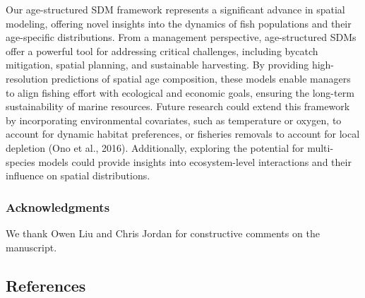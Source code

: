 \documentclass[
]{article}
\begin{document}
Our age-structured SDM framework represents a significant advance in
spatial modeling, offering novel insights into the dynamics of fish
populations and their age-specific distributions. From a management
perspective, age-structured SDMs offer a powerful tool for addressing
critical challenges, including bycatch mitigation, spatial planning, and
sustainable harvesting. By providing high-resolution predictions of
spatial age composition, these models enable managers to align fishing
effort with ecological and economic goals, ensuring the long-term
sustainability of marine resources. Future research could extend this
framework by incorporating environmental covariates, such as temperature
or oxygen, to account for dynamic habitat preferences, or fisheries
removals to account for local depletion (Ono et al., 2016).
Additionally, exploring the potential for multi-species models could
provide insights into ecosystem-level interactions and their influence
on spatial distributions.

\subsubsection{Acknowledgments}\label{acknowledgments}

We thank Owen Liu and Chris Jordan for constructive comments on the
manuscript.

\break
\clearpage

\subsection{References}\label{references}
\end{document}
